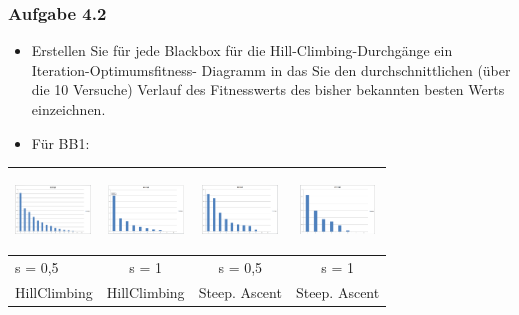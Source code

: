 \documentclass[xcolor=pdftex,dvipsnames,table]{beamer}
\begin{document}
\begin{frame}
  \frametitle{Aufgabe 4.2}
  \begin{itemize}
  		\item Erstellen Sie für jede Blackbox für die Hill-Climbing-Durchgänge ein Iteration-Optimumsfitness-
Diagramm in das Sie den durchschnittlichen (über die 10 Versuche) Verlauf des Fitnesswerts des
bisher bekannten besten Werts einzeichnen.

\item Für BB1:
  \end{itemize}
  
   \begin{tabular}{|l|c|c|c|} 
      \rowcolor[HTML]{CCD6CC}	
      \includegraphics[width=20mm, height=20mm]{img/excel_avg_and_charts/pic/BB1_EazyHillClimbing_s_0_5.png} 
 &  \includegraphics[width=20mm, height=20mm]{img/excel_avg_and_charts/pic/BB1_EazyHillClimbing_s_1.png} 
 &  \includegraphics[width=20mm, height=20mm]{img/excel_avg_and_charts/pic/BB1_SteepestAscentHillClimbing_s_0_5.png}
 &  \includegraphics[width=20mm, height=20mm]{img/excel_avg_and_charts/pic/BB1_SteepestAscentHillClimbing_s_1.png} \\ \hline
      \rowcolor[HTML]{A6BFB9} s = 0,5 & s = 1 & s = 0,5 & s = 1 \\ \hline
       \rowcolor[HTML]{A6BFB9} HillClimbing& HillClimbing & Steep. Ascent & Steep. Ascent \\ \hline
    \end{tabular}
\end{frame}
\end{document}

